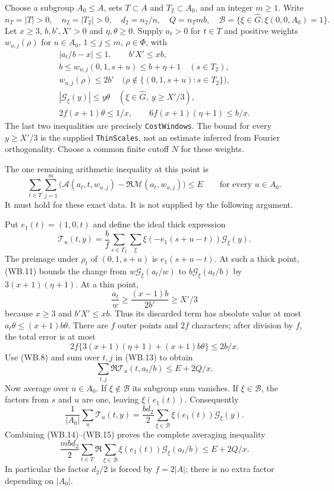 Choose a subgroup $A_0\le A$, sets $T\subset A$ and
$T_2\subset A_0$, and an integer $m\ge1$. Write
\[
 n_T=|T|>0,\quad n_2=|T_2|>0,\quad
 d_2=n_2/n,\quad Q=n_Tmb,\quad
 \mathcal B=\{\xi\in\widehat G:\xi(0,0,A_0)=1\}.
\]
Let $x\ge3$, $b,b',X'>0$ and $\eta,\theta\ge0$. Supply
$a_t>0$ for $t\in T$ and positive weights
$w_{u,j}(\rho)$ for $u\in A_0$, $1\le j\le m$, $\rho\in\Phi$,
with
\begin{gather*}
 |a_t/b-x|\le1,\qquad b'X'\le xb,\\
 b\le w_{u,j}(0,1,s+u)\le b+\eta+1\quad(s\in T_2),\\
 w_{u,j}(\rho)\le2b'\quad
       \bigl(\rho\notin\{(0,1,s+u):s\in T_2\}\bigr),\\
 |\mathcal G_\xi(y)|\le y\theta
       \quad(\xi\in\widehat G,\ y\ge X'/3),\\
 2f(x+1)\theta\le1/x,\qquad
 6f(x+1)(\eta+1)\le b/x.
 \tag{WB.12}
\end{gather*}
The last two inequalities are precisely \texttt{CostWindows}.
The bound for every $y\ge X'/3$ is the supplied
\texttt{ThinScales}, not an estimate inferred from Fourier
orthogonality. Choose a common finite cutoff $N$ for these weights.

The one remaining arithmetic inequality at this point is
\[
 \sum_{t\in T}\sum_{j=1}^m
   \bigl(\mathcal A(a_t,t,w_{u,j})
                     -\Re\mathcal M(a_t,w_{u,j})\bigr)
 \le E\qquad\text{for every }u\in A_0.
 \tag{WB.13}\label{eq:wb-arithmetic-gap}
\]
It must hold for these exact data. It is not supplied by the following
argument.

Put $e_1(t)=(1,0,t)$ and define the ideal thick expression
\[
 \mathcal T_u(t,y)=\frac b f\sum_{s\in T_2}\sum_\xi
             \xi(-e_1(s+u-t))\mathcal G_\xi(y).
\]
The preimage under $\rho_t$ of $(0,1,s+u)$ is
$e_1(s+u-t)$. At such a thick point, (WB.11) bounds the change
from $w\mathcal G_\xi(a_t/w)$ to
$b\mathcal G_\xi(a_t/b)$ by $3(x+1)(\eta+1)$.
At a thin point,
\[
 \frac{a_t}{w}\ge\frac{(x-1)b}{2b'}\ge X'/3
\]
because $x\ge3$ and $b'X'\le xb$. Thus its discarded term has
absolute value at most $a_t\theta\le(x+1)b\theta$.
There are $f$ outer points and $2f$ characters; after division by
$f$, the total error is at most
\[
 2f\{3(x+1)(\eta+1)+(x+1)b\theta\}\le2b/x.
\]
Use (WB.8) and sum over $t,j$ in (WB.13) to obtain
\[
 \sum_{t,j}\Re\mathcal T_u(t,a_t/b)\le E+2Q/x.
 \tag{WB.14}
\]
Now average over $u\in A_0$. If $\xi\notin\mathcal B$ its
subgroup sum vanishes. If $\xi\in\mathcal B$, the factors from
$s$ and $u$ are one, leaving $\xi(e_1(t))$. Consequently
\[
 \frac1{|A_0|}\sum_u\mathcal T_u(t,y)
 =\frac{bd_2}{2}\sum_{\xi\in\mathcal B}
                         \xi(e_1(t))\mathcal G_\xi(y).
 \tag{WB.15}
\]
Combining (WB.14)--(WB.15) proves the complete averaging inequality
\[
 \frac{mbd_2}{2}\sum_{t\in T}
     \Re\sum_{\xi\in\mathcal B}\xi(e_1(t))
                                     \mathcal G_\xi(a_t/b)
 \le E+2Q/x.
 \tag{WB.16}
\]
In particular the factor $d_2/2$ is forced by
$f=2|A|$; there is no extra factor depending on $|A_0|$.

